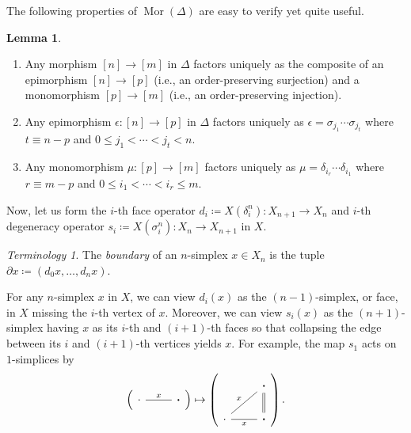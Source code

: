 \documentclass[10pt,letterpaper,cm]{nupset}
\theoremstyle{definition}
\theoremstyle{theorem}
\newtheorem{lemma}[definition]{Lemma}
\theoremstyle{remark}
\newtheorem*{term}{Terminology}
\DeclareMathOperator{\mor}{Mor}
\newcommand{\0}{\mathbf{0}}
\newcommand{\1}{\mathbf{1}}
\newcommand{\2}{\mathbf{2}}
\newcommand{\be}{\begin{enumerate}}
\newcommand{\ee}{\end{enumerate}}
\begin{document}
The following properties of $\mor(\varDelta)$ are easy to verify yet quite useful.

\begin{lemma}\label{mordelt} $ $
\be[label=(\arabic*)]
\item Any morphism $ \left[n\right] \to \left[m\right]$ in $\varDelta$ factors uniquely as the composite of an epimorphism $ \left[n\right] \to \left[p\right]$ (i.e., an order-preserving surjection) and a monomorphism $ \left[p\right] \to \left[m\right]$ (i.e., an order-preserving injection).
\item Any epimorphism $\epsilon : \left[n\right] \to \left[p\right]$ in $\varDelta$ factors uniquely as $\epsilon = \sigma_{j_{1}} \cdots \sigma_{j_{t}}$ where $t \equiv n-p$ and \linebreak $0 \leq j_{1}<\cdots<j_{t}<n$.
\item Any monomorphism $\mu : \left[p\right] \to \left[m\right]$ factors uniquely as $\mu=\delta_{i_{r}} \cdots \delta_{i_{1}}$ where $r \equiv m-p$ and \linebreak $0 \leq i_{1}<\cdots<i_{r} \leq m$.
\ee
\end{lemma}

\smallskip

Now, let us form the $i$-th face operator $d_i \coloneqq X(\delta_i^n) :X_{n+1}\to X_n$ and $i$-th degeneracy operator $s_i \coloneqq X(\sigma_i^n) : X_n \to X_{n+1}$ in $X$.

\begin{term}
The \textit{boundary} of an $n$-simplex $x\in X_n$ is the tuple $\partial{x} \coloneqq \left(d_0{x}, \ldots, d_n{x}\right)$.
\end{term}

For any $n$-simplex $x$ in $X$, we can view $d_i(x)$ as the $\left(n-1\right)$-simplex, or face, in $X$ missing the $i$-th vertex of $x$. Moreover, we can view $s_i(x)$ as the $\left(n+1\right)$-simplex having $x$ as its $i$-th and $\left(i+1\right)$-th faces so that collapsing the edge between its $i$ and $\left(i+1\right)$-th vertices yields $x$. For example, the map $s_1$ acts on $1$-simplices by
\[
\left(\begin{tikzcd}
\cdotp \arrow[r, "x", no head] & \boldsymbol{\cdot}
\end{tikzcd}\right) \mapsto
\left( \begin{tikzcd}
                                  & \boldsymbol{\cdot}\arrow[d, equal] \\
\cdotp \arrow[r, no head, "x"'] \arrow[ru, no head, "x"] &\boldsymbol{\cdot}          
\end{tikzcd}\right).
\]
\end{document}

